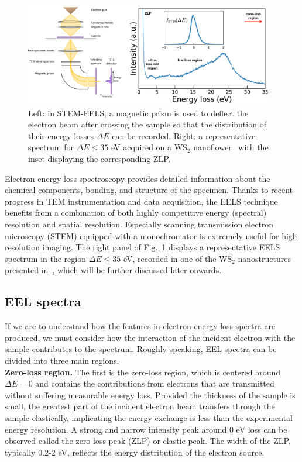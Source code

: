 \begin{figure}[H]
    \centering
    \includegraphics[width=0.97\textwidth]{plots/EELS.pdf}
    \caption{Left: in STEM-EELS, a magnetic
      prism is used to deflect the electron beam after crossing the sample
      so that the distribution of their energy losses $\Delta E$ can be recorded.
      Right: a representative spectrum for $\Delta E \le 35$ eV acquired 
      on a WS$_2$ nanoflower~\cite{SabryaWS2} with
      the inset displaying the corresponding ZLP.
      }
    \label{fig:EELS}
\end{figure}

Electron energy loss spectroscopy  provides detailed information about the 
chemical components, bonding, and structure of the specimen.
%
Thanks to recent progress in TEM instrumentation and data acquisition, the EELS technique 
benefits from a combination of both
highly competitive energy (spectral) resolution and spatial resolution.
%
Especially scanning transmission electron microscopy (STEM) equipped with a monochromator 
is extremely useful for high resolution imaging.
The right panel of Fig.~\ref{fig:EELS} displays
a representative EELS spectrum in the region $\Delta E \le 35$ eV, recorded
in one of the WS$_2$ nanostructures presented in~\cite{SabryaWS2},
which will be further discussed later onwards.

\subsection{EEL spectra}
If we are to understand how the features in electron energy loss spectra are produced, 
we must consider how the interaction of the incident electron with the sample 
contributes to the spectrum. 
%
Roughly speaking, EEL spectra can be divided into three main regions.\\

{\bf Zero-loss region.} The first is the zero-loss region, which is centered around $\Delta E=0$
and contains the contributions from electrons that are transmitted without suffering
measurable energy loss.
%
Provided the thickness of the sample is small, the greatest part of the 
incident electron beam transfers through the sample elastically, 
implicating the energy exchange is less than the experimental energy resolution. 
%
A strong and narrow intensity peak around 0 eV loss can be observed called the zero-loss peak (ZLP) or elastic peak. 
The width of the ZLP, typically 0.2-2 eV, reflects the energy distribution of the electron source.

